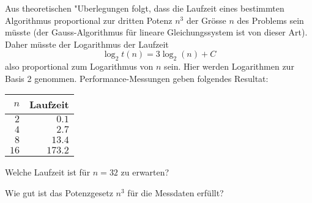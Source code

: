 Aus theoretischen "Uberlegungen folgt, dass die Laufzeit eines bestimmten
Algorithmus proportional zur dritten Potenz $n^3$ der
Grösse $n$ des Problems sein müsste (der Gauss-Algorithmus
für lineare Gleichungssystem ist von dieser Art). Daher müsste
der Logarithmus der Laufzeit 
\[
\log_2 t(n)=3\log_2(n) +C
\]
also proportional zum Logarithmus von $n$ sein.
Hier werden Logarithmen zur Basis 2 genommen.
Performance-Messungen geben folgendes Resultat:
\begin{center}
\begin{tabular}{|r|r|}
\hline
$n$&Laufzeit\\
\hline
$ 2$&$  0.1$\\
$ 4$&$  2.7$\\
$ 8$&$ 13.4$\\
$16$&$173.2$\\
\hline
\end{tabular}
\end{center}
\begin{teilaufgaben}
\item Welche Laufzeit ist für $n=32$ zu erwarten?
\item Wie gut ist das Potenzgesetz $n^3$ für die Messdaten erfüllt?
\end{teilaufgaben}

